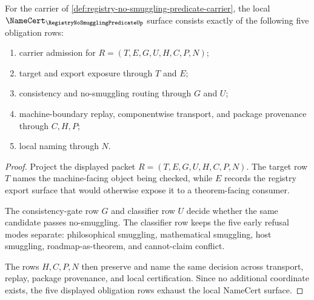 \begin{theorem}
\label{thm:registry-no-smuggling-predicate-namecert-obligations}
For the carrier of \autoref{def:registry-no-smuggling-predicate-carrier}, the local $\NameCert_{\RegistryNoSmugglingPredicateUp}$ surface consists exactly of the following five obligation rows:
\begin{enumerate}
\item carrier admission for $R=(T,E,G,U,H,C,P,N)$;
\item target and export exposure through $T$ and $E$;
\item consistency and no-smuggling routing through $G$ and $U$;
\item machine-boundary replay, componentwise transport, and package provenance through $C,H,P$;
\item local naming through $N$.
\end{enumerate}
\end{theorem}
\begin{proof}
Project the displayed packet $R=(T,E,G,U,H,C,P,N)$. The target row $T$ names the machine-facing object being checked, while $E$ records the registry export surface that would otherwise expose it to a theorem-facing consumer.

The consistency-gate row $G$ and classifier row $U$ decide whether the same candidate passes no-smuggling. The classifier row keeps the five early refusal modes separate: philosophical smuggling, mathematical smuggling, host smuggling, roadmap-as-theorem, and cannot-claim conflict.

The rows $H,C,P,N$ then preserve and name the same decision across transport, replay, package provenance, and local certification. Since no additional coordinate exists, the five displayed obligation rows exhaust the local NameCert surface.
\end{proof}


